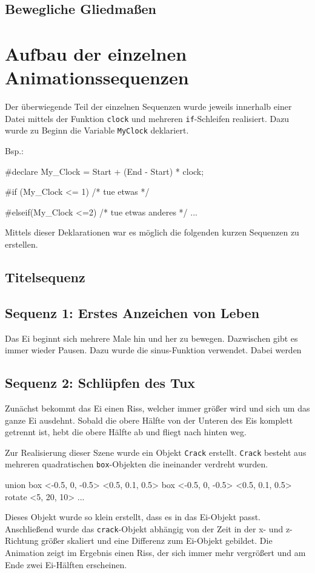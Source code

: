 \documentclass[11pt,parskip]{scrartcl}
\begin{document}
\subsection{Bewegliche Gliedmaßen}
\newpage


\section{Aufbau der einzelnen Animationssequenzen}
Der überwiegende Teil der einzelnen Sequenzen wurde jeweils innerhalb einer
Datei mittels der Funktion \texttt{clock} und mehreren \texttt{if}-Schleifen
realisiert. Dazu wurde zu Beginn die Variable \texttt{MyClock} deklariert.

Bsp.:
%
\begin{tcblisting}{}
  #declare My_Clock = Start + (End - Start) * clock;

  #if (My_Clock <= 1)
  /* tue etwas */

  #elseif(My_Clock <=2)
  /* tue etwas anderes */
  ...
\end{tcblisting}
%
Mittels dieser Deklarationen war es möglich die folgenden kurzen Sequenzen zu
erstellen.

\subsection{Titelsequenz}

\subsection{Sequenz 1: Erstes Anzeichen von Leben}
Das Ei beginnt sich mehrere Male hin und her zu bewegen. Dazwischen gibt es
immer wieder Pausen. Dazu wurde die sinus-Funktion verwendet. Dabei werden

\subsection{Sequenz 2: Schlüpfen des Tux}
Zunächst bekommt das Ei einen Riss, welcher immer größer wird und sich um das
ganze Ei ausdehnt. Sobald die obere Hälfte von der Unteren des Eis komplett
getrennt ist, hebt die obere Hälfte ab und fliegt nach hinten weg.

Zur Realisierung dieser Szene wurde ein Objekt \texttt{Crack} erstellt.
\texttt{Crack} besteht aus mehreren quadratischen \texttt{box}-Objekten die
ineinander verdreht wurden.
%
\begin{tcblisting}{}
  union{
    box{
      <-0.5, 0, -0.5>
      <0.5, 0.1, 0.5>
    }
    box{
      <-0.5, 0, -0.5>
      <0.5, 0.1, 0.5>
      rotate <5, 20, 10>
    }
    ...
  }
\end{tcblisting}
%
Dieses Objekt wurde so klein erstellt, dass es in das Ei-Objekt passt.
Anschließend wurde das \texttt{crack}-Objekt abhängig von der Zeit in der x- und
z-Richtung größer skaliert und eine Differenz zum Ei-Objekt gebildet. Die
Animation zeigt im Ergebnis einen Riss, der sich immer mehr vergrößert und am
Ende zwei Ei-Hälften erscheinen.
\end{document}
